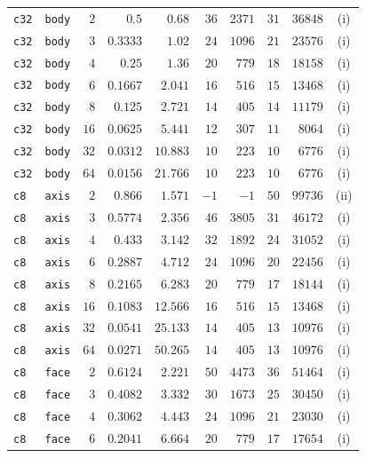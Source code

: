 \begin{longtable}{llrrrrrrrc}
\texttt{c32} & \texttt{body} & $2$ & $0.5$ & $0.68$ & $36$ & $2371$ & $31$ & $36848$ & (i) \\
\texttt{c32} & \texttt{body} & $3$ & $0.3333$ & $1.02$ & $24$ & $1096$ & $21$ & $23576$ & (i) \\
\texttt{c32} & \texttt{body} & $4$ & $0.25$ & $1.36$ & $20$ & $779$ & $18$ & $18158$ & (i) \\
\texttt{c32} & \texttt{body} & $6$ & $0.1667$ & $2.041$ & $16$ & $516$ & $15$ & $13468$ & (i) \\
\texttt{c32} & \texttt{body} & $8$ & $0.125$ & $2.721$ & $14$ & $405$ & $14$ & $11179$ & (i) \\
\texttt{c32} & \texttt{body} & $16$ & $0.0625$ & $5.441$ & $12$ & $307$ & $11$ & $8064$ & (i) \\
\texttt{c32} & \texttt{body} & $32$ & $0.0312$ & $10.883$ & $10$ & $223$ & $10$ & $6776$ & (i) \\
\texttt{c32} & \texttt{body} & $64$ & $0.0156$ & $21.766$ & $10$ & $223$ & $10$ & $6776$ & (i) \\
\texttt{c8} & \texttt{axis} & $2$ & $0.866$ & $1.571$ & $-1$ & $-1$ & $50$ & $99736$ & (ii) \\
\texttt{c8} & \texttt{axis} & $3$ & $0.5774$ & $2.356$ & $46$ & $3805$ & $31$ & $46172$ & (i) \\
\texttt{c8} & \texttt{axis} & $4$ & $0.433$ & $3.142$ & $32$ & $1892$ & $24$ & $31052$ & (i) \\
\texttt{c8} & \texttt{axis} & $6$ & $0.2887$ & $4.712$ & $24$ & $1096$ & $20$ & $22456$ & (i) \\
\texttt{c8} & \texttt{axis} & $8$ & $0.2165$ & $6.283$ & $20$ & $779$ & $17$ & $18144$ & (i) \\
\texttt{c8} & \texttt{axis} & $16$ & $0.1083$ & $12.566$ & $16$ & $516$ & $15$ & $13468$ & (i) \\
\texttt{c8} & \texttt{axis} & $32$ & $0.0541$ & $25.133$ & $14$ & $405$ & $13$ & $10976$ & (i) \\
\texttt{c8} & \texttt{axis} & $64$ & $0.0271$ & $50.265$ & $14$ & $405$ & $13$ & $10976$ & (i) \\
\texttt{c8} & \texttt{face} & $2$ & $0.6124$ & $2.221$ & $50$ & $4473$ & $36$ & $51464$ & (i) \\
\texttt{c8} & \texttt{face} & $3$ & $0.4082$ & $3.332$ & $30$ & $1673$ & $25$ & $30450$ & (i) \\
\texttt{c8} & \texttt{face} & $4$ & $0.3062$ & $4.443$ & $24$ & $1096$ & $21$ & $23030$ & (i) \\
\texttt{c8} & \texttt{face} & $6$ & $0.2041$ & $6.664$ & $20$ & $779$ & $17$ & $17654$ & (i) \\

\end{longtable}
